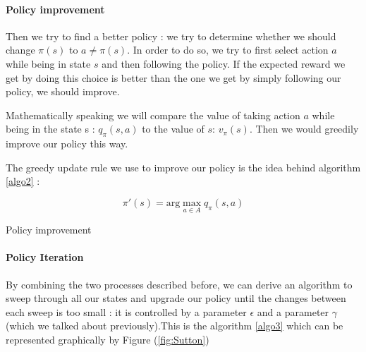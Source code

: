\documentclass[14pt,a4paper]{article}
\theoremstyle{definition}
\begin{document}
\paragraph{Policy improvement}

Then we try to find a better policy : we try to determine whether we should change $\pi(s) $ to $ a\neq\pi(s)$. In order to do so, we try to first select action $a$ while being in state $s$ and then following the policy. If the expected reward we get by doing this choice is better than the one we get by simply following our policy, we should improve.

Mathematically speaking we will compare the value of taking action $a$ while being in the state s : $q_{\pi}(s,a)$ to the value of $s$: $v_{\pi}(s)$. Then we would greedily improve our policy this way.

The greedy update rule we use to improve our policy is the idea behind algorithm \ref{algo2} : 

$$ 
\pi'(s)=\text{arg}\max_{a \in A}q_{\pi}(s,a)
$$

\begin{algorithm}

    
    \caption{Policy improvement}
    \label{algo2}

\end{algorithm}



\paragraph{Policy Iteration} By combining the two processes described before, we can derive an algorithm to sweep through all our states and upgrade our policy until the changes between each sweep is too small : it is controlled by a parameter $\epsilon$ and a parameter $\gamma$ (which we talked about previously).This is the algorithm \ref{algo3} which can be represented graphically by Figure (\ref{fig:Sutton})
\end{document}
